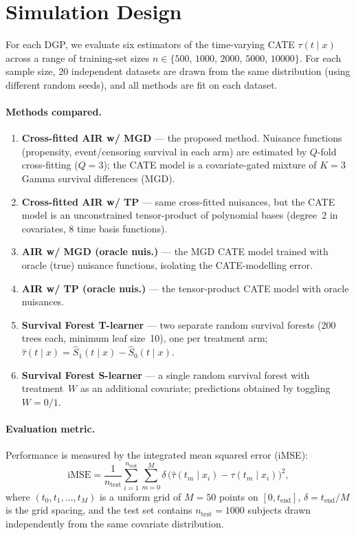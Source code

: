 \documentclass{article}
\begin{document}
\section*{Simulation Design}

For each DGP, we evaluate six estimators of the time-varying CATE $\tau(t\mid x)$ across a range of training-set sizes $n \in \{500,\, 1000,\, 2000,\, 5000,\, 10000\}$.
For each sample size, $20$ independent datasets are drawn from the same distribution (using different random seeds), and all methods are fit on each dataset.

\paragraph{Methods compared.}
\begin{enumerate}
  \item \textbf{Cross-fitted AIR w/ MGD} --- the proposed method.  Nuisance functions (propensity, event/censoring survival in each arm) are estimated by $Q$-fold cross-fitting ($Q=3$); the CATE model is a covariate-gated mixture of $K=3$ Gamma survival differences (MGD).
  \item \textbf{Cross-fitted AIR w/ TP} --- same cross-fitted nuisances, but the CATE model is an unconstrained tensor-product of polynomial bases (degree~2 in covariates, $8$ time basis functions).
  \item \textbf{AIR w/ MGD (oracle nuis.)} --- the MGD CATE model trained with oracle (true) nuisance functions, isolating the CATE-modelling error.
  \item \textbf{AIR w/ TP (oracle nuis.)} --- the tensor-product CATE model with oracle nuisances.
  \item \textbf{Survival Forest T-learner} --- two separate random survival forests (200 trees each, minimum leaf size~10), one per treatment arm; $\hat\tau(t\mid x) = \hat S_1(t\mid x) - \hat S_0(t\mid x)$.
  \item \textbf{Survival Forest S-learner} --- a single random survival forest with treatment~$W$ as an additional covariate; predictions obtained by toggling $W=0/1$.
\end{enumerate}

\paragraph{Evaluation metric.}
Performance is measured by the integrated mean squared error (iMSE):
\[
  \mathrm{iMSE}
  = \frac{1}{n_{\mathrm{test}}} \sum_{i=1}^{n_{\mathrm{test}}}
    \sum_{m=0}^{M} \delta\,
    \bigl(\hat\tau(t_m \mid x_i) - \tau(t_m \mid x_i)\bigr)^2,
\]
where $(t_0, t_1, \dots, t_M)$ is a uniform grid of $M=50$ points on $[0, t_{\mathrm{end}}]$, $\delta = t_{\mathrm{end}} / M$ is the grid spacing, and the test set contains $n_{\mathrm{test}} = 1000$ subjects drawn independently from the same covariate distribution.
\end{document}
